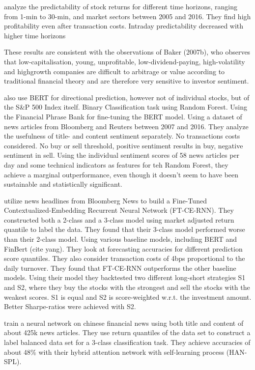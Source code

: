 \documentclass[12pt,a4paper]{article}
\begin{document}
	
	\bigskip
	\textbf{\cite{liu_intraday_2023}} analyze the predictability of stock returns for different time horizons, ranging from 1-min to 30-min, and market sectors between 2005 and 2016.
	They find high profitability even after transaction costs.
	Intraday predictability decreased with higher time horizons
	
	
	\bigskip
	These results are consistent with the observations of Baker (2007b), who observes that low-capitalisation, young, unprofitable, low-dividend-paying, high-volatility and highgrowth companies are difficult to arbitrage or value according to traditional financial theory and are therefore very sensitive to investor sentiment.
	
	\bigskip
	\textbf{\cite{fazlija_using_2022}} also use BERT for directional prediction, however not of individual stocks, but of the S\&P 500 Index itself.
	Binary Classification task using Random Forest.
	Using the Financial Phrase Bank for fine-tuning the BERT model. %
	Using a dataset of news articles from Bloomberg and Reuters between 2007 and 2016. %
	They analyze the usefulness of title- and content sentiment separately.
	No transactions costs considered.
	No buy or sell threshold, positive sentiment results in buy, negative sentiment in sell.
	Using the individual sentiment scores of 58 news articles per day and some technical indicators as features for teh
	Random Forest, they achieve a marginal outperformance, even though it doesn't seem to have been sustainable and statistically significant.
	
	\bigskip
	\textbf{\cite{chen_stock_2021}} utilize news headlines from Bloomberg News to build a Fine-Tuned Contextualized-Embedding Recurrent Neural Network (FT-CE-RNN).
	They constructed both a 2-class and a 3-class model using market adjusted return quantile to label the data.
	They found that their 3-class model performed worse than their 2-class model.
	Using various baseline models, including BERT and FinBert (cite yang).
	They look at forecasting accuracies for different prediction score quantiles.
	They also consider transaction costs of 4bps proportional to the daily turnover.
	They found that FT-CE-RNN outperforms the other baseline models.
	Using their model they backtested two different long-short strategies S1 and S2, where they buy the stocks with the strongest and sell the stocks with the weakest scores.
	S1 is equal and S2 is score-weighted w.r.t. the investment amount.
	Better Sharpe-ratios were achieved with S2.
	
	\cite{hu_listening_2019} train a neural network on chinese financial news using both title and content of about 425k news articles.
	They use return quantiles of the data set to construct a label balanced data set for a 3-class classification task.
	They achieve accuracies of about 48\% with their hybrid attention network with self-learning process (HAN-SPL).
	
\end{document}
